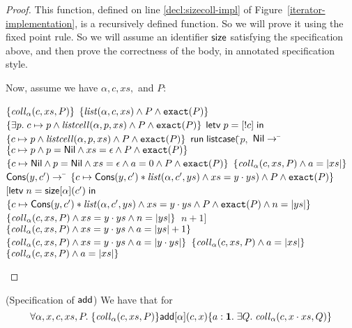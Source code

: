 \begin{proof}
This function, defined on line \ref{decl:sizecoll-impl} of Figure~\ref{iterator-implementation},
is a recursively defined function. So we will prove it using the fixed point rule. So we 
will assume an identifier $\mathsf{size}$ satisfying the specification above, and then prove
the correctness of the body, in annotated specification style. 

Now, assume we have $\alpha, c, xs,$ and $P$: 

\begin{specification}
\nextline $\{{\mathit{coll}_\alpha(c, xs, P)}\}$ 
\nextline $\{{\mathit{list}(\alpha, c, xs) \land P \land \mathtt{exact}({P})}\}$ 
\nextline $\{{\exists p.\; c \mapsto p \land \mathit{listcell}(\alpha, p, xs) \land P \land \mathtt{exact}({P})}\}$ 
\nextline $\mathsf{letv}\;p = [!c]\;\mathsf{in}\;$
\nextline $\{{c \mapsto p \land \mathit{listcell}(\alpha, p, xs) \land P \land \mathtt{exact}({P})}\}$ 
\nextline $\mathsf{run}\;\mathsf{listcase}($\=$p,$ 
\nextline \> $\mathsf{Nil} \to $
\nextline \> \qquad \=$\{{c \mapsto p \land p = \mathsf{Nil} \land xs = \epsilon \land P \land \mathtt{exact}({P})}\}$ 
\nextline \> \> 
\nextline \> \> $\{{c \mapsto \mathsf{Nil} \land p = \mathsf{Nil} \land xs = \epsilon \land a = 0 \land P \land \mathtt{exact}({P})}\}$ 
\nextline \> \> $\{{\mathit{coll}_\alpha(c, xs, P) \land a = |xs|}\}$ 
\nextline \> $\mathsf{Cons}(y, c') \to $ 
\nextline \> \qquad \= $\{{c \mapsto \mathsf{Cons}(y, c') * \mathit{list}(\alpha, c', ys) \land xs = y\cdot ys) \land P \land \mathtt{exact}({P})}\}$ 
\nextline \> \> $[\mathsf{letv}\;n = \mathsf{size}[\alpha](c')\;\mathsf{in}\;$
\nextline \> \> \,$\{{c \mapsto \mathsf{Cons}(y, c') * \mathit{list}(\alpha, c', ys) \land xs = y\cdot ys \land P \land \mathtt{exact}({P}) \land n = |ys|}\}$ 
\nextline \> \> \,$\{{\mathit{coll}_\alpha(c, xs, P) \land xs = y\cdot ys \land n = |ys|}\}$ 
\nextline \> \> \,$n+1]$
\nextline \> \> $\{{\mathit{coll}_\alpha(c, xs, P) \land xs = y\cdot ys \land a = |ys| + 1}\}$ 
\nextline \> \> $\{{\mathit{coll}_\alpha(c, xs, P) \land xs = y\cdot ys \land a = |y\cdot ys|}\}$ 
\nextline \> \> $\{{\mathit{coll}_\alpha(c, xs, P) \land a = |xs|}\}$ 
\nextline $\{{\mathit{coll}_\alpha(c, xs, P) \land a = |xs|}\}$ 
\end{specification}
\end{proof}

\begin{lemma}{(Specification of $\mathsf{add}$)}
We have that for 
\begin{displaymath}
  \forall \alpha, x, c, xs, P.\; \{{\mathit{coll}_\alpha(c, xs, P)}\}{\mathsf{add}[\alpha](c, x)}\{{a:\mathbf{1}}.\;{\exists Q.\; \mathit{coll}_\alpha(c, x\cdot xs, Q)}\}
\end{displaymath}
\end{lemma}

